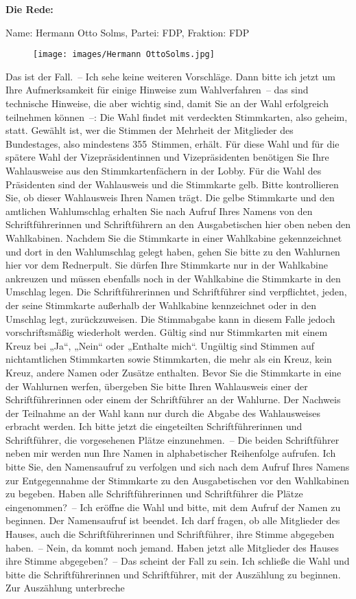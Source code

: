 \documentclass[10pt, a4paper]{report}
\begin{document}
\textbf{Die Rede:}

Name: Hermann Otto Solms, Partei: FDP, Fraktion: FDP

\begin{figure}[!ht]
\texttt{[image: images/Hermann OttoSolms.jpg]}
\end{figure}


Das ist der Fall. – Ich sehe keine weiteren Vorschläge. Dann bitte ich jetzt um Ihre Aufmerksamkeit für einige Hinweise zum Wahlverfahren – das sind technische Hinweise, die aber wichtig sind, damit Sie an der Wahl erfolgreich teilnehmen können –: Die Wahl findet mit verdeckten Stimmkarten, also geheim, statt. Gewählt ist, wer die Stimmen der Mehrheit der Mitglieder des Bundestages, also mindestens 355 Stimmen, erhält. Für diese Wahl und für die spätere Wahl der Vizepräsidentinnen und Vizepräsidenten benötigen Sie Ihre Wahlausweise aus den Stimmkartenfächern in der Lobby. Für die Wahl des Präsidenten sind der Wahlausweis und die Stimmkarte gelb. Bitte kontrollieren Sie, ob dieser Wahlausweis Ihren Namen trägt. Die gelbe Stimmkarte und den amtlichen Wahlumschlag erhalten Sie nach Aufruf Ihres Namens von den Schriftführerinnen und Schriftführern an den Ausgabetischen hier oben neben den Wahlkabinen. Nachdem Sie die Stimmkarte in einer Wahlkabine gekennzeichnet und dort in den Wahlumschlag gelegt haben, gehen Sie bitte zu den Wahlurnen hier vor dem Rednerpult. Sie dürfen Ihre Stimmkarte nur in der Wahlkabine ankreuzen und müssen ebenfalls noch in der Wahlkabine die Stimmkarte in den Umschlag legen. Die Schriftführerinnen und Schriftführer sind verpflichtet, jeden, der seine Stimmkarte außerhalb der Wahlkabine kennzeichnet oder in den Umschlag legt, zurückzuweisen. Die Stimmabgabe kann in diesem Falle jedoch vorschriftsmäßig wiederholt werden. Gültig sind nur Stimmkarten mit einem Kreuz bei „Ja“, „Nein“ oder „Enthalte mich“. Ungültig sind Stimmen auf nichtamtlichen Stimmkarten sowie Stimmkarten, die mehr als ein Kreuz, kein Kreuz, andere Namen oder Zusätze enthalten. Bevor Sie die Stimmkarte in eine der Wahlurnen werfen, übergeben Sie bitte Ihren Wahlausweis einer der Schriftführerinnen oder einem der Schriftführer an der Wahlurne. Der Nachweis der Teilnahme an der Wahl kann nur durch die Abgabe des Wahlausweises erbracht werden. Ich bitte jetzt die eingeteilten Schriftführerinnen und Schriftführer, die vorgesehenen Plätze einzunehmen. – Die beiden Schriftführer neben mir werden nun Ihre Namen in alphabetischer Reihenfolge aufrufen. Ich bitte Sie, den Namensaufruf zu verfolgen und sich nach dem Aufruf Ihres Namens zur Entgegennahme der Stimmkarte zu den Ausgabetischen vor den Wahlkabinen zu begeben. Haben alle Schriftführerinnen und Schriftführer die Plätze eingenommen? – Ich eröffne die Wahl und bitte, mit dem Aufruf der Namen zu beginnen. Der Namensaufruf ist beendet. Ich darf fragen, ob alle Mitglieder des Hauses, auch die Schriftführerinnen und Schriftführer, ihre Stimme abgegeben haben. – Nein, da kommt noch jemand. Haben jetzt alle Mitglieder des Hauses ihre Stimme abgegeben? – Das scheint der Fall zu sein. Ich schließe die Wahl und bitte die Schriftführerinnen und Schriftführer, mit der Auszählung zu beginnen. Zur Auszählung unterbreche 
\end{document}
